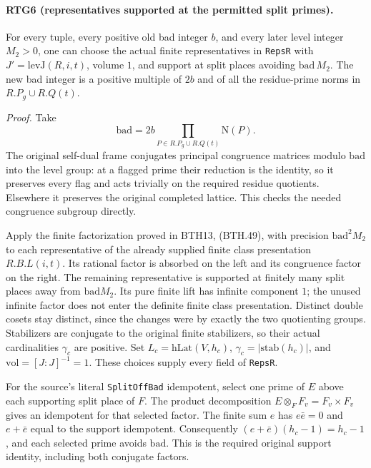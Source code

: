 \paragraph{RTG6 (representatives supported at the permitted split primes).}
\label{claim:RTG6}
For every tuple, every positive old bad integer $b$, and every later
level integer $M_2>0$, one can choose the actual finite representatives
in \texttt{RepsR} with $J'=\mathrm{levJ}(R,i,t)$, volume $1$, and
support at split places avoiding $\mathrm{bad}\,M_2$.  The new bad
integer is a positive multiple of $2b$ and of all the residue-prime
norms in $R.P_g\cup R.Q(t)$.

\emph{Proof.}
Take
\[
 \mathrm{bad}=2b\prod_{P\in R.P_g\cup R.Q(t)}\mathrm N(P).
                                                               \tag{RTG.8}
\]
The original self-dual frame conjugates principal congruence matrices
modulo $\mathrm{bad}$ into the level group: at a flagged prime their
reduction is the identity, so it preserves every flag and acts trivially
on the required residue quotients.  Elsewhere it preserves the original
completed lattice.  This checks the needed congruence subgroup directly.

Apply the finite factorization proved in BTH13, (BTH.49), with precision
$\mathrm{bad}^2M_2$ to each representative of the already supplied finite
class presentation $R.B.L(i,t)$.  Its rational factor is absorbed on the
left and its congruence factor on the right.  The remaining representative
is supported at finitely many split places away from
$\mathrm{bad}M_2$.  Its pure finite lift has infinite component $1$;
the unused infinite factor does not enter the definite finite class
presentation.  Distinct double cosets stay distinct, since the changes
were by exactly the two quotienting groups.  Stabilizers are conjugate
to the original finite stabilizers, so their actual cardinalities
$\gamma_c$ are positive.  Set $L_c=\mathrm{hLat}(V,h_c)$,
$\gamma_c=|\mathrm{stab}(h_c)|$, and $\mathrm{vol}=[J:J]^{-1}=1$.
These choices supply every field of \texttt{RepsR}.

For the source's literal \texttt{SplitOffBad} idempotent, select one
prime of $E$ above each supporting split place of $F$.  The product
decomposition $E\otimes_FF_v=F_v\times F_v$ gives an idempotent for
that selected factor.  The finite sum $e$ has $e\bar e=0$ and
$e+\bar e$ equal to the support idempotent.  Consequently
$(e+\bar e)(h_c-1)=h_c-1$, and each selected prime avoids
$\mathrm{bad}$.  This is the required original support identity,
including both conjugate factors.

